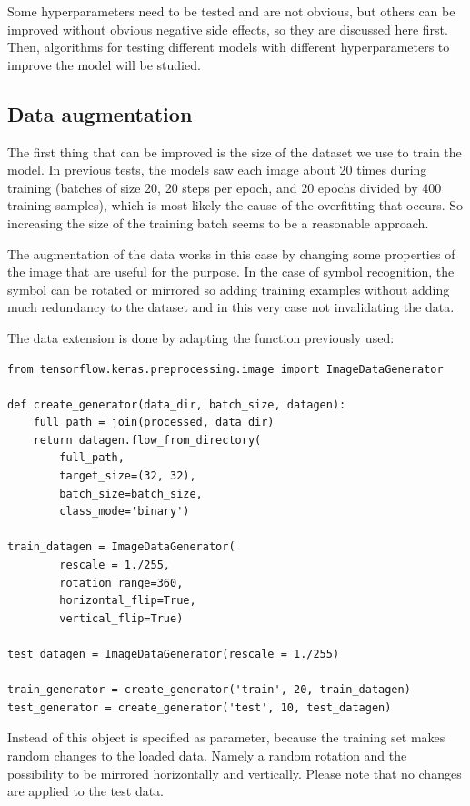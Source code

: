 Some hyperparameters need to be tested and are not obvious, but others can be improved without obvious negative side effects, so they are discussed here first. Then, algorithms for testing different models with different hyperparameters to improve the model will be studied.

\subsection{Data augmentation}\label{ch:data_augmentation}

The first thing that can be improved is the size of the dataset we use to train the model.
In previous tests, the models saw each image about 20 times during training (batches of size 20, 20 steps per epoch, and 20 epochs divided by 400 training samples), which is most likely the cause of the overfitting that occurs.
So increasing the size of the training batch seems to be a reasonable approach.

The augmentation of the data works in this case by changing some properties of the image that are useful for the purpose.
In the case of symbol recognition, the symbol can be rotated or mirrored so adding training examples without adding much redundancy to the dataset and in this very case not invalidating the data.

The data extension is done by adapting the  function previously used:

\begin{lstlisting}[caption={Data augmentation.}]
from tensorflow.keras.preprocessing.image import ImageDataGenerator

def create_generator(data_dir, batch_size, datagen):
    full_path = join(processed, data_dir)
    return datagen.flow_from_directory(
        full_path,
        target_size=(32, 32),
        batch_size=batch_size,
        class_mode='binary')

train_datagen = ImageDataGenerator(
        rescale = 1./255,
        rotation_range=360,
        horizontal_flip=True,
        vertical_flip=True)

test_datagen = ImageDataGenerator(rescale = 1./255)

train_generator = create_generator('train', 20, train_datagen)
test_generator = create_generator('test', 10, test_datagen)
\end{lstlisting}

Instead of  this object is specified as parameter, because the training set makes random changes to the loaded data.
Namely a random rotation and the possibility to be mirrored horizontally and vertically.
Please note that no changes are applied to the test data.

